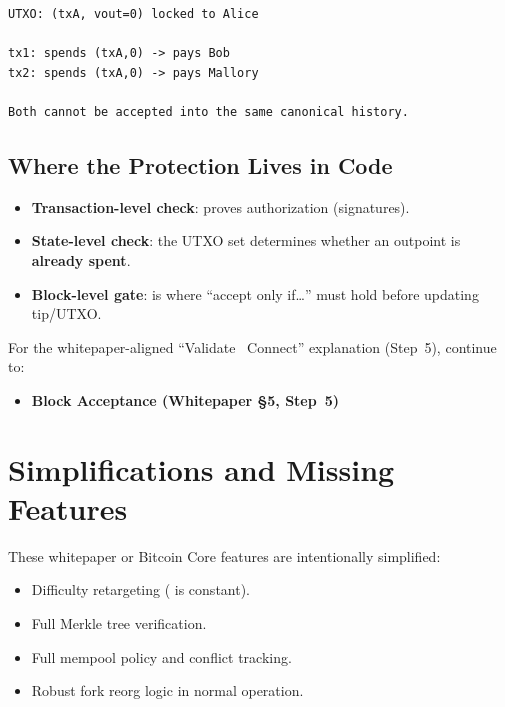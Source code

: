 \begin{verbatim}
UTXO: (txA, vout=0) locked to Alice

tx1: spends (txA,0) -> pays Bob
tx2: spends (txA,0) -> pays Mallory

Both cannot be accepted into the same canonical history.
\end{verbatim}

\subsection{Where the Protection Lives in Code}
\label{sec:ch09-7-protection}

\begin{itemize}
  \item \textbf{Transaction-level check}:  proves authorization (signatures).
  \item \textbf{State-level check}: the UTXO set determines whether an outpoint is \textbf{already spent}.
  \item \textbf{Block-level gate}:  is where ``accept only if\ldots'' must hold before updating tip/UTXO.
\end{itemize}

For the whitepaper-aligned ``Validate \textrightarrow\ Connect'' explanation (Step~5), continue to:

\begin{itemize}
  \item \textbf{Block Acceptance (Whitepaper \S5, Step~5)}
\end{itemize}

\section{Simplifications and Missing Features}
\label{sec:ch09-7-simplifications}

These whitepaper or Bitcoin Core features are intentionally simplified:

\begin{itemize}
  \item Difficulty retargeting ( is constant).
  \item Full Merkle tree verification.
  \item Full mempool policy and conflict tracking.
  \item Robust fork reorg logic in normal operation.
\end{itemize}

